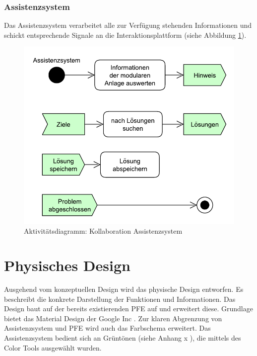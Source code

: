 \subsubsection*{Assistenzsystem}
Das Assistenzsystem verarbeitet alle zur Verfügung stehenden Informationen und schickt entsprechende Signale an die Interaktionsplattform (siehe Abbildung \ref{pic:Kollaboration-Assistenzsystem}).
\begin{figure}[htbp]
\centering
\includegraphics[scale=0.5]{DA_files/UML/Konzept/Aktivitaetsdiagramm-Assistenz.pdf}
\caption{Aktivitätsdiagramm: Kollaboration Assistenzsystem}
\label{pic:Kollaboration-Assistenzsystem}
\end{figure}

\section{Physisches Design}
\label{4:Physikalische-Design}
Ausgehend vom konzeptuellen Design wird das physische Design entworfen. Es beschreibt die konkrete Darstellung der Funktionen und Informationen. Das Design baut auf der bereits existierenden PFE auf und erweitert diese. Grundlage bietet das Material Design \cite{MaterialDesign} der Google Inc . Zur klaren Abgrenzung von Assistenzsystem und PFE wird auch das Farbschema erweitert. Das Assistenzsystem bedient sich an Grüntönen (siehe Anhang x ), die mittels des Color Tools \cite{ColorTool}  ausgewählt wurden.

